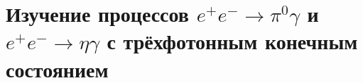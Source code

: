 \section{Изучение процессов \texorpdfstring{$e^+ e^- \to \pi^0 \gamma$}{e+ e- --> pi0 gamma} и \texorpdfstring{$e^+ e^- \to \eta \gamma$}{e+ e- --> eta gamma} с трёхфотонным конечным состоянием}











% 